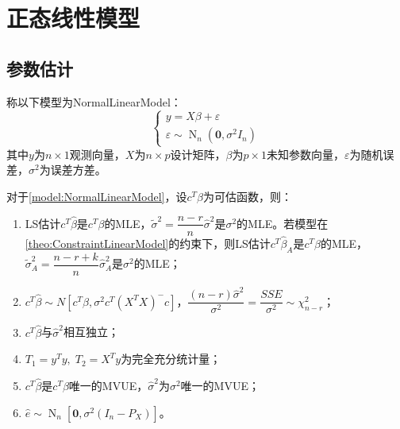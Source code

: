 \section{正态线性模型}
\subsection{参数估计}
\begin{definition}\label{model:NormalLinearModel}
	称以下模型为\gls{NormalLinearModel}：
	\begin{equation*}
		\begin{cases}
			y=X\beta+\varepsilon \\
			\varepsilon\sim\operatorname{N}_n(\mathbf{0},\sigma^2I_n)
		\end{cases}
	\end{equation*}
	其中$y$为$n\times 1$观测向量，$X$为$n\times p$设计矩阵，$\beta$为$p\times 1$未知参数向量，$\varepsilon$为随机误差，$\sigma^2$为误差方差。
\end{definition}
\begin{property}\label{prop:NormalLinearModel}
	对于\cref{model:NormalLinearModel}，设$c^T\beta$为可估函数，则：
	\begin{enumerate}
		\item LS估计$c^T\hat{\beta}$是$c^T\beta$的MLE，$\tilde{\sigma}^2=\dfrac{n-r}{n}\hat{\sigma}^2$是$\sigma^2$的MLE。若模型在\cref{theo:ConstraintLinearModel}的约束下，则LS估计$c^T\hat{\beta}_A$是$c^T\beta$的MLE，$\tilde{\sigma}_A^2=\dfrac{n-r+k}{n}\hat{\sigma}_A^2$是$\sigma^2$的MLE；
		\item $c^T\hat{\beta}\sim N[c^T\beta,\sigma^2c^T(X^TX)^-c]$，$\dfrac{(n-r)\hat{\sigma}^2}{\sigma^2}=\dfrac{SSE}{\sigma^2}\sim\chi_{n-r}^2$；
		\item $c^T\hat{\beta}$与$\hat{\sigma}^2$相互独立；
		\item $T_1=y^Ty,\;T_2=X^Ty$为完全充分统计量；
		\item $c^T\hat{\beta}$是$c^T\beta$唯一的MVUE，$\hat{\sigma}^2$为$\sigma^2$唯一的MVUE；
		\item $\hat{e}\sim\operatorname{N}_n[\mathbf{0},\sigma^2(I_n-P_X)]$。
	\end{enumerate}
\end{property}
